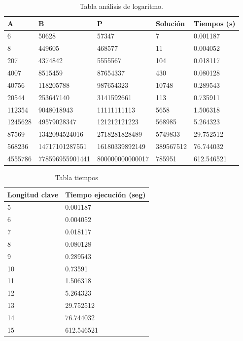 \begin{table}[h]
	\begin{center}
		\begin{tabular}{|l|l|l|l|l|}
			\hline 
			\rowcolor{LightCyan}
			A & B & P & Solución & Tiempos (s) \\ \hline
			6 & 50628 & 57347& 7 & 0.001187 \\ \hline 
			8 & 449605 & 468577& 11 & 0.004052 \\ \hline
			207 & 4374842 & 5555567& 104 & 0.018117 \\ \hline
			4007 & 8515459 & 87654337& 430 & 0.080128\\ \hline
			40756 & 118205788 & 987654323& 10748 & 0.289543\\ \hline
			20544 & 253647140 & 3141592661& 113 & 0.735911\\ \hline
			112354 & 9048018943 & 11111111113& 5658 & 1.506318\\ \hline
			1245628 & 49579028347 & 121212121223& 568985 & 5.264323\\ \hline
			87569 & 1342094524016 & 2718281828489& 5749833 & 29.752512\\ \hline
			568236 & 14717101287551 & 16180339892149& 389567512 & 76.744032\\ \hline
			4555786 & 778596955901441 & 800000000000017& 785951 & 612.546521\\ \hline
		\end{tabular}
		\caption{Tabla análisis de logaritmo.}
		\label{tabla:compleja}
	\end{center}
\end{table}

\begin{table}[htbp]
	\begin{center}
		\begin{tabular}{|l|l|}
			\hline
			\rowcolor{LightCyan}
			Longitud clave & Tiempo ejecución (seg) \\ \hline
			5 & 0.001187 \\ \hline 
			6 & 0.004052 \\ \hline
			7 & 0.018117 \\ \hline
			8 & 0.080128\\ \hline
			9 & 0.289543\\ \hline
			10 & 0.73591\\ \hline
			11 & 1.506318\\ \hline
			12 & 5.264323\\ \hline
			13 & 29.752512\\ \hline
			14 & 76.744032 \\ \hline
			15 & 612.546521\\ \hline
		\end{tabular}
		\caption{Tabla tiempos}
		\label{tabla:resumen}
	\end{center}
\end{table}


